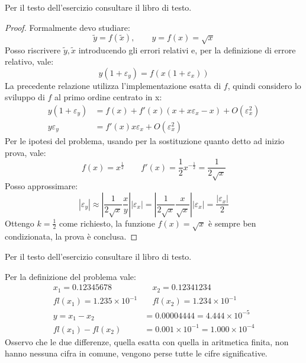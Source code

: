\begin{exercise}[1.16]
Per il testo dell'esercizio consultare il libro di testo.
\end{exercise}
\begin{proof}
Formalmente devo studiare:
\begin{displaymath}
	\tilde{y} = f(\tilde{x}), \quad \quad y = f(x) = \sqrt{x}
\end{displaymath}
Posso riscrivere $\tilde{y}, \tilde{x}$ introducendo gli errori relativi e, per 
la definizione di errore relativo, vale:
\begin{displaymath}
	y(1 + \varepsilon_{y}) = f(x(1 + \varepsilon_{x}))
\end{displaymath}
La precedente relazione utilizza l'implementazione esatta di $f$, quindi considero
lo sviluppo di $f$ al primo ordine centrato in x:
\begin{displaymath}
\begin{split}
	y(1 + \varepsilon_{y}) & = f(x) + f'(x)(x + x\varepsilon_{x} - x) + O(\varepsilon_{x}^{2}) \\
	y\varepsilon_{y} & = f'(x)x\varepsilon_{x} + O(\varepsilon_{x}^{2})
\end{split}
\end{displaymath}
Per le ipotesi del problema, usando per la sostituzione quanto detto ad inizio prova, vale:
\begin{displaymath}
f(x) = x^{\frac{1}{2}} \quad \quad f'(x) = \frac{1}{2}x^{-\frac{1}{2}} 
= \frac{1}{2\sqrt{x}}
\end{displaymath}
Posso approssimare:
\begin{displaymath}
|\varepsilon_{y}| \approx \left | \frac{1}{2\sqrt{x}} \frac{x}{y} \right||\varepsilon_{x}|= 
\left | \frac{1}{2\sqrt{x}} \frac{x}{\sqrt{x}} \right||\varepsilon_{x}| = 
\frac{|\varepsilon_{x}|}{2}
\end{displaymath}
Ottengo $k = \frac{1}{2}$ come richiesto, la funzione $f(x) = \sqrt{x}$
\`e sempre ben condizionata, la prova \`e conclusa.
\end{proof}

\begin{exercise}[1.17]
Per il testo dell'esercizio consultare il libro di testo.
\end{exercise}
Per la definizione del problema vale:
\begin{displaymath}
\begin{split}
	x_{1} = 0.12345678 & \quad x_{2} = 0.12341234 \\
	fl(x_{1}) = 1.235 \times 10^{-1} & \quad fl(x_{2}) = 1.234 \times 10^{-1} \\
	y = x_{1} - x_{2} &= 0.00004444 = 4.444 \times 10^{-5} \\
	fl(x_{1}) - fl(x_{2}) &= 0.001 \times 10^{-1} = 1.000 \times 10^{-4}
\end{split}
\end{displaymath}
Osservo che le due differenze, quella esatta con quella in aritmetica finita,
non hanno nessuna cifra in comune, vengono perse tutte le cifre significative.

